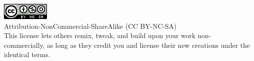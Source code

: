 {{\vspace{1em}

}

\vspace{0.5em}

\parbox[t]{0.8\linewidth}{
\fontsize{6}{6} \selectfont 
\includegraphics[scale=0.4]{../figures/CCBYNCSA.png} \\
\textcolor{titleDarkBlue}{ 
Attribution-NonCommercial-ShareAlike (CC BY-NC-SA) \\ 
This license lets others remix, tweak, and build upon your work
non-commercially, as long as they credit you and license their new
creations under the identical terms.
\vspace{1em}
}}
}

